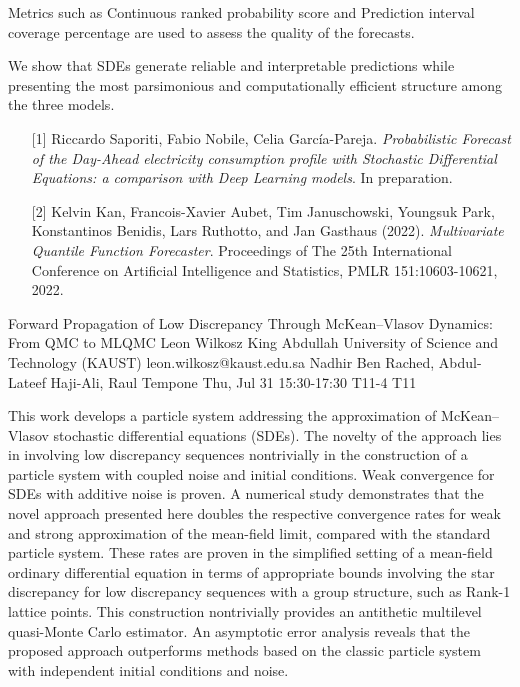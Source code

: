 \begin{talk}
Metrics such as Continuous ranked probability score and Prediction interval coverage percentage are used to assess the quality of the forecasts. 

We show that SDEs generate reliable and interpretable predictions while presenting the most parsimonious and computationally efficient structure among the three models.


\medskip

 

\begin{enumerate}
    \item[{[1]}] Riccardo Saporiti, Fabio Nobile, Celia García-Pareja. {\it Probabilistic Forecast of the Day-Ahead electricity consumption profile with Stochastic Differential Equations: a comparison with Deep Learning models}. In preparation.

	\item[{[2]}] Kelvin Kan, Francois-Xavier Aubet, Tim Januschowski, Youngsuk Park, Konstantinos Benidis, Lars Ruthotto, and Jan Gasthaus (2022). {\it Multivariate Quantile Function Forecaster}. Proceedings of The 25th International Conference on Artificial Intelligence and Statistics, PMLR 151:10603-10621, 2022.
 
\end{enumerate}
 
\end{talk}

\begin{talk}
  {Forward Propagation of Low Discrepancy Through McKean--Vlasov Dynamics: From QMC to MLQMC}%
  {Leon Wilkosz}%
  {King Abdullah University of Science and Technology (KAUST)}%
  {leon.wilkosz@kaust.edu.sa}%
  {Nadhir Ben Rached, Abdul-Lateef Haji-Ali, Raul Tempone}%
  {}%
  {Thu, Jul 31 15:30-17:30}%
  {T11-4}%
  {T11}%
  
				
			
This work develops a particle system addressing the approximation of \linebreak McKean--Vlasov stochastic differential equations (SDEs). The novelty of the approach lies in involving low discrepancy sequences nontrivially in the construction of a particle system with coupled noise and initial conditions. Weak convergence for SDEs with additive noise is proven. A numerical study demonstrates that the novel approach presented here doubles the respective convergence rates for weak and strong approximation of the mean-field limit, compared with the standard particle system. These rates are proven in the simplified setting of a mean-field ordinary differential equation in terms of appropriate bounds involving the star discrepancy for low discrepancy sequences with a group structure, such as Rank-1 lattice points. This construction nontrivially provides an antithetic multilevel quasi-Monte Carlo estimator. An asymptotic error analysis reveals that the proposed approach outperforms methods based on the classic particle system with independent initial conditions and noise.
\end{talk}

